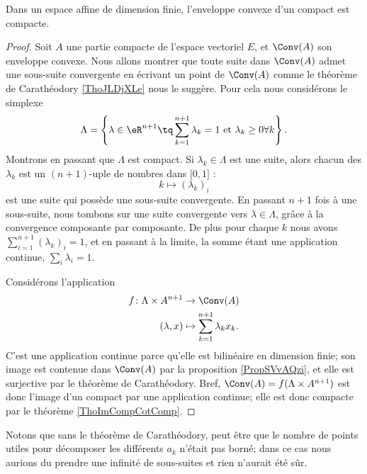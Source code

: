 \begin{corollary}   \label{CorOFrXzIf}
    Dans un espace affine de dimension finie, l'enveloppe convexe d'un compact est compacte.
\end{corollary}

\begin{proof}
    Soit \( A\) une partie compacte de l'espace vectoriel \( E\), et \( \Conv(A)\) son enveloppe convexe. Nous allons montrer que toute suite dans \( \Conv(A)\) admet une sous-suite convergente en écrivant un point de \( \Conv(A)\) comme le théorème de Carathéodory \ref{ThoJLDjXLe} nous le suggère. Pour cela nous considérons le simplexe
    \begin{equation}
        \Lambda=\left\{  \lambda\in \eR^{n+1}\tq \sum_{k=1}^{n+1}\lambda_k=1\text{ et } \lambda_k\geq 0\forall k   \right\}.    
    \end{equation}
    Montrons en passant que \( \Lambda\) est compact. Si \( \lambda_k\in \Lambda\) est une suite, alors chacun des \( \lambda_k\) est un \( (n+1)\)-uple de nombres dans \( \mathopen[ 0 , 1 \mathclose]\) :
    \begin{equation}
        k\mapsto (\lambda_k)_i
    \end{equation}
    est une suite qui possède une sous-suite convergente. En passant \( n+1\) fois à une sous-suite, nous tombons sur une suite convergente vers \( \lambda\in\Lambda\), grâce à la convergence composante par composante. De plus pour chaque \( k\) nous avons \( \sum_{i=1}^{n+1}(\lambda_k)_i=1\), et en passant à la limite, la somme étant une application continue, \( \sum_{i}\lambda_i=1\).

    Considérons l'application
    \begin{equation}
        \begin{aligned}
            f\colon \Lambda\times A^{n+1}&\to \Conv(A) \\
            (\lambda,x)&\mapsto \sum_{k=1}^{n+1}\lambda_kx_k. 
        \end{aligned}
    \end{equation}
    C'est une application continue parce qu'elle est bilinéaire en dimension finie; son image est contenue dans \( \Conv(A)\) par la proposition \ref{PropSVvAQzi}, et elle est surjective par le théorème de Carathéodory. Bref, \( \Conv(A)=f(\Lambda\times A^{n+1})\) est donc l'image d'un compact par une application continue; elle est donc compacte par le théorème \ref{ThoImCompCotComp}.
\end{proof}
Notons que sans le théorème de Carathéodory, peut être que le nombre de points utiles pour décomposer les différents \( a_k\) n'était pas borné; dans ce cas nous aurions du prendre une infinité de sous-suites et rien n'aurait été sûr.

